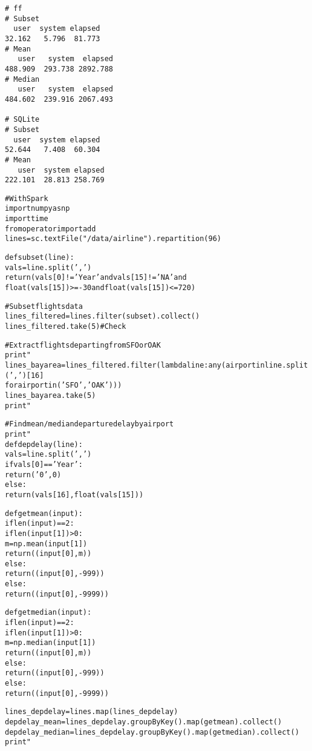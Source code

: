 \documentclass{article}\usepackage[]{graphicx}\usepackage[]{color}
\makeatletter
\newenvironment{kframe}{%
 \def\at@end@of@kframe{}%
 \ifinner\ifhmode%
  \def\at@end@of@kframe{\end{minipage}}%
  \begin{minipage}{\columnwidth}%
 \fi\fi%
 \def\FrameCommand##1{\hskip\@totalleftmargin \hskip-\fboxsep
 \colorbox{shadecolor}{##1}\hskip-\fboxsep
     \hskip-\linewidth \hskip-\@totalleftmargin \hskip\columnwidth}%
 \MakeFramed {\advance\hsize-\width
   \@totalleftmargin\z@ \linewidth\hsize
   \@setminipage}}%
 {\par\unskip\endMakeFramed%
 \at@end@of@kframe}
\newenvironment{knitrout}{}{} %
\makeatother
\begin{document}
\begin{verbatim}
# ff
# Subset
  user  system elapsed 
32.162   5.796  81.773 
# Mean
   user   system  elapsed 
488.909  293.738 2892.788 
# Median
   user   system  elapsed 
484.602  239.916 2067.493 

# SQLite
# Subset
  user  system elapsed 
52.644   7.408  60.304 
# Mean
   user  system elapsed 
222.101  28.813 258.769 
\end{verbatim}

\begin{knitrout}
\color{fgcolor}\begin{kframe}
\begin{alltt}
# With Spark
import numpy as np
import time
from operator import add
lines = sc.textFile("/data/airline").repartition(96)

def subset(line):
  vals = line.split(',')
  return(vals[0] != 'Year' and vals[15] != 'NA' and
  float(vals[15]) >= -30 and float(vals[15]) <= 720)

# Subset flights data
lines_filtered = lines.filter(subset).collect()
lines_filtered.take(5) # Check

# Extract flights departing from SFO or OAK
print "%f " %  time.time()
lines_bayarea = lines_filtered.filter(lambda line: any(airport in line.split(',')[16] 
  for airport in ('SFO', 'OAK')))
lines_bayarea.take(5)
print "%f " %  time.time()

# Find mean/median departure delay by airport
print "%f " %  time.time()
def depdelay(line):
  vals = line.split(',')
  if vals[0] == 'Year':
    return('0', 0)
  else:
    return(vals[16], float(vals[15]))
  
def getmean(input):
  if len(input) == 2:
    if len(input[1]) > 0:
      m = np.mean(input[1])
      return((input[0], m))
    else:
      return((input[0], -999))
  else:
    return((input[0], -9999))
  
def getmedian(input):
  if len(input) == 2:
    if len(input[1]) > 0:
      m = np.median(input[1])
      return((input[0], m))
    else:
      return((input[0], -999))
  else:
    return((input[0], -9999))
  
lines_depdelay = lines.map(lines_depdelay)
depdelay_mean = lines_depdelay.groupByKey().map(getmean).collect()
depdelay_median = lines_depdelay.groupByKey().map(getmedian).collect()
print "%f " %  time.time()
\end{alltt}
\end{kframe}
\end{knitrout}
\end{document}
